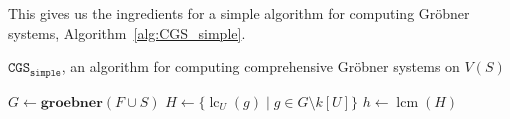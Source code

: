\documentclass[a4paper, 12pt]{article}
\DeclareMathOperator{\LC}{lc}
\DeclareMathOperator{\lcm}{lcm}
\theoremstyle{changedot}
\theoremstyle{changedotbreak}
\theoremstyle{nonumberplain}
\begin{document}
This gives us the ingredients for a simple algorithm for computing Gröbner systems, Algorithm~\ref{alg:CGS_simple}.

\begin{algorithm}\label{alg:CGS_simple}
  \caption{$\mathtt{CGS_{simple}}$, an algorithm for computing comprehensive Gröbner systems on $V(S)$}
    {
    \KwRet{\emptyset}\;
  } {
    $G \gets \mathbf{groebner}(F \cup S)$\;
    $H \gets \{\LC_{U}(g) \mid g \in G \setminus k[U]\}$\;
    $h \gets \lcm(H)$\;
  }
\end{algorithm}
\end{document}
